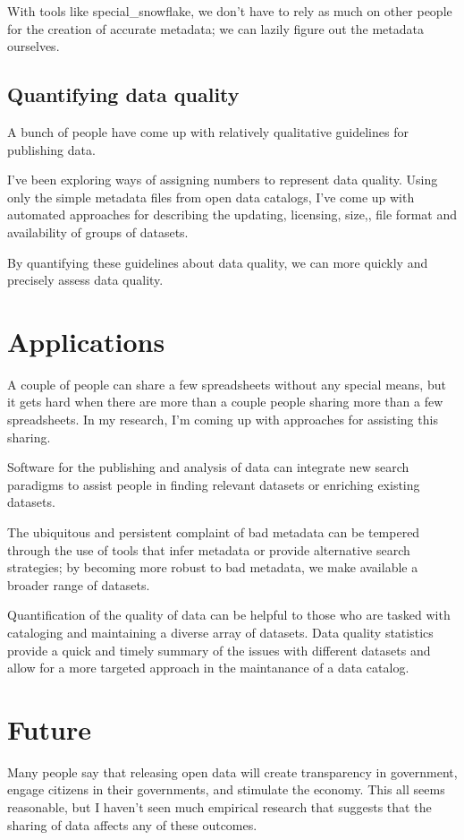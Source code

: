 \documentclass{acm_proc_article-sp}
\begin{document}
With tools like special\_snowflake, we don't have to rely as much on other
people for the creation of accurate metadata; we can lazily figure out the
metadata ourselves.

\subsection{Quantifying data quality}
A bunch of people\cite{open-data-census}\cite{fivestars}\cite{sunlight}\cite{sebastopol}\cite{odi}
have come up with relatively qualitative guidelines for publishing data.

I've been exploring ways of assigning numbers to represent data quality.
Using only the simple metadata files from open data catalogs, I've come up
with automated approaches for describing the updating,\cite{updatdness}
licensing,\cite{licensing} size,\cite{summary}, file format\cite{file-formats}
and availability\cite{dead}\cite{zombie} of groups of datasets.

By quantifying these guidelines about data quality, we can more quickly and
precisely assess data quality.

\section{Applications}
A couple of people can share a few spreadsheets without any special means,
but it gets hard when there are more than a couple people sharing more than
a few spreadsheets. In my research, I'm coming up with approaches for assisting
this sharing.

Software for the publishing and analysis of data can integrate new search
paradigms to assist people in finding relevant datasets or enriching existing
datasets.

The ubiquitous and persistent complaint of bad metadata can be tempered through
the use of tools that infer metadata or provide alternative search strategies;
by becoming more robust to bad metadata, we make available a broader range of
datasets.

Quantification of the quality of data can be helpful to those who are tasked
with cataloging and maintaining a diverse array of datasets. Data quality
statistics provide a quick and timely summary of the issues with different
datasets and allow for a more targeted approach in the maintanance of a
data catalog.

\section{Future}
Many people say that releasing open data will create transparency in government,
engage citizens in their governments, and stimulate the economy. This all seems
reasonable, but I haven't seen much empirical research that suggests that the
sharing of data affects any of these outcomes.
\end{document}
